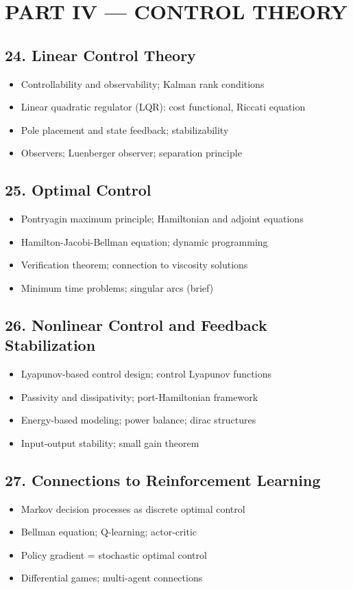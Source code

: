 \section{PART IV --- CONTROL THEORY}

\subsection{24. Linear Control Theory}
\begin{itemize}
\item Controllability and observability; Kalman rank conditions
\item Linear quadratic regulator (LQR): cost functional, Riccati equation
\item Pole placement and state feedback; stabilizability
\item Observers; Luenberger observer; separation principle
\end{itemize}

\subsection{25. Optimal Control}
\begin{itemize}
\item Pontryagin maximum principle; Hamiltonian and adjoint equations
\item Hamilton-Jacobi-Bellman equation; dynamic programming
\item Verification theorem; connection to viscosity solutions
\item Minimum time problems; singular arcs (brief)
\end{itemize}

\subsection{26. Nonlinear Control and Feedback Stabilization}
\begin{itemize}
\item Lyapunov-based control design; control Lyapunov functions
\item Passivity and dissipativity; port-Hamiltonian framework
\item Energy-based modeling; power balance; dirac structures
\item Input-output stability; small gain theorem
\end{itemize}

\subsection{27. Connections to Reinforcement Learning}
\begin{itemize}
\item Markov decision processes as discrete optimal control
\item Bellman equation; Q-learning; actor-critic
\item Policy gradient = stochastic optimal control
\item Differential games; multi-agent connections
\end{itemize}


